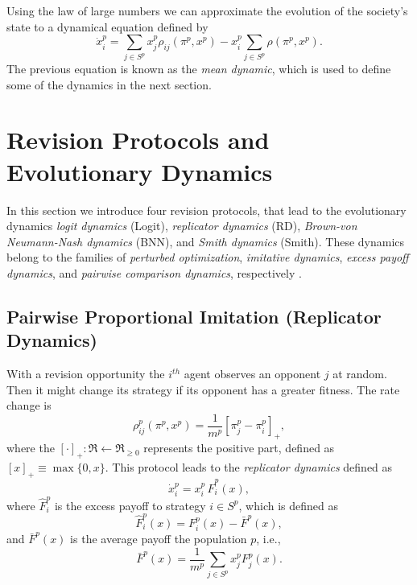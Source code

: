 \documentclass[a4paper,10pt]{article}
\def\th{^{th}}
\def\th{^{th}}
\begin{document}
 Using the law of large numbers we can approximate the evolution of the society's state to a dynamical equation defined by
 \begin{equation}\label{eq:mean_dynamic}
  \dot{x}_i^p = \sum_{j\in S^p} x_j^p \rho_{ij} (\pi^p, x^p) - x_i^p \sum_{j\in S^p} \rho(\pi^p, x^p).
 \end{equation}
The previous equation is known as the \emph{mean dynamic}, which is used to define  some of the dynamics in the next section.

 
 
 
 
 
 
 
 
 
\section{Revision Protocols and Evolutionary Dynamics}\label{sec:protocols}
 
 
In this section we introduce four revision protocols, that lead to the evolutionary dynamics \emph{logit dynamics} (Logit), \emph{replicator dynamics} (RD), \emph{Brown-von Neumann-Nash dynamics} (BNN), and \emph{Smith dynamics} (Smith). These dynamics belong to the families of \emph{perturbed optimization}, \emph{imitative dynamics}, \emph{excess payoff dynamics}, and \emph{pairwise comparison dynamics}, respectively \cite{hofbauer2001nash, sandholm_book}. 
 
 
 
 
 
 
 \subsection{Pairwise Proportional Imitation (Replicator Dynamics)}

With a revision opportunity the $i\th$ agent observes an opponent $j$ at random. Then it might change its strategy if  its opponent has a greater fitness. The rate change is 
%
\begin{equation}
\rho_{ij}^p(\pi^p, x^p) = \frac{1}{m^p} [\pi_j^p - \pi_i^p]_+,
\end{equation}
where the $[\cdot]_+:\Re \leftarrow \Re_{\geq0}$ represents the positive part, defined as $[ x ]_+ \equiv \max\{ 0, x \}$.
This protocol leads to the \emph{replicator dynamics} defined as
\begin{equation}\label{eq:replicator}
\dot{x}_i^p = x_i^p \, \hat{F}_i^p \left( x \right),
\end{equation}
where $\hat{F}_i^p$ is the excess payoff to strategy $i\in S^p$, which is defined as   
\begin{equation}
\hat{F}_i^p (x) =  F_i^p(x) - \bar{F}^p(x),
\end{equation}
and $\bar{F}^p(x)$ is the average payoff the population $p$, i.e., 
\begin{equation}
 \bar{F}^p(x) = \frac{1}{m^p} \sum_{j \in S^p} x_j^p F_j^p(x).
\end{equation}
\end{document}
